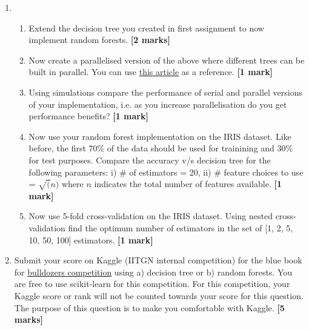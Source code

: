 \documentclass[colorlinks]{article}
\begin{document}
\begin{enumerate}



	 \item \begin{enumerate}
	 	\item Extend the decision tree you created in first assignment to now implement random forests.  \textbf{[2 marks]}
	 	\item Now create a parallelised version of the above where different trees can be built in parallel. You can use \href{https://sebastianraschka.com/Articles/2014_multiprocessing.html}{this article} as a reference. \textbf{[1 mark]}
	 	\item Using simulations compare the performance of serial and parallel versions of your implementation, i.e. as you increase parallelisation do you get performance benefits? \textbf{[1 mark]}
	 	\item Now use your random forest implementation on the IRIS dataset. Like before, the first 70\% of the data should be used for trainining and 30\% for test purposes. Compare the accuracy v/s decision tree for the following parameters: i) \# of estimators = 20, ii) \# feature choices to use = $\sqrt(n)$ where $n$ indicates the total number of features available.  \textbf{[1 mark]}
	 	\item Now use 5-fold cross-validation on the IRIS dataset. Using nested cross-validation find the optimum number of estimators in the set of [1, 2, 5, 10, 50, 100] estimators.  \textbf{[1 mark]}
	 \end{enumerate}
 
	\item Submit your score on Kaggle (IITGN internal competition) for the blue book for \href{https://www.kaggle.com/c/iitgnml/}{bulldozers competition} using a) decision tree or b) random forests. You are free to use scikit-learn for this competition. For this competition, your Kaggle score or rank will not be counted towards your score for this question. The purpose of this question is to make you comfortable with Kaggle.
\textbf{[5 marks]}


\end{enumerate}
\end{document}
